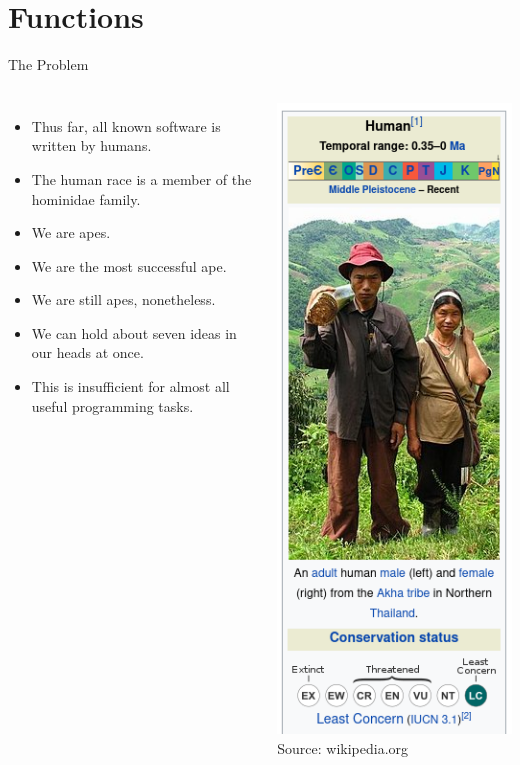 \documentclass[]{beamer}
\begin{document}
\section{Functions}
\begin{frame}{The Problem}
\begin{columns}
    \begin{itemize}[<+->]
        \item Thus far, all known software is written by humans.
        \item The human race is a member of the hominidae family.
        \item We are apes.
        \item We are the most successful ape.
        \item We are still apes, nonetheless.  
        \item We can hold about seven ideas in our heads at once.
        \item This is insufficient for almost all useful programming
            tasks.
    \end{itemize}

        \begin{center}
            \includegraphics[height=0.75\textheight]{images/human}
            \newline
            {\tiny Source: wikipedia.org}
        \end{center}

\end{columns}
\end{frame}
\end{document}

